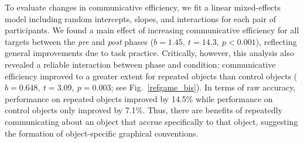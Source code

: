 \documentclass[10pt,letterpaper]{article}
\newcommand{\ndg}[1]{{\textcolor{Green}{[ndg: #1]}}}
\begin{document}
To evaluate changes in communicative efficiency, we fit a linear mixed-effects model including random intercepts, slopes, and interactions for each pair of participants.
We found a main effect of increasing communicative efficiency for all targets between the \textit{pre} and \textit{post} phases ($b = 1.45,~t = 14.3,~p <0.001$), reflecting general improvements due to task practice.
Critically, however, this analysis also revealed a reliable interaction between phase and condition: communicative efficiency improved to a greater extent for repeated objects than control objects ($b = 0.648, ~t = 3.09,~p = 0.003$; see Fig.~\ref{refgame_bis}).
In terms of raw accuracy, performance on repeated objects improved by 14.5\% while performance on control objects only improved by 7.1\%.
Thus, there are benefits of repeatedly communicating about an object that accrue specifically to that object, suggesting the formation of object-specific graphical conventions.






\end{document}
